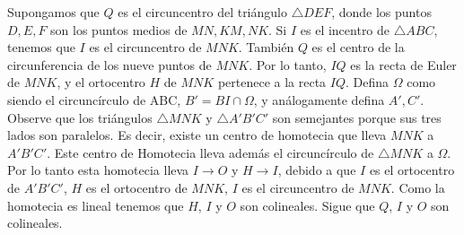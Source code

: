 \begin{sol}
	Supongamos que $Q$ es el circuncentro del tri\'angulo $\triangle DEF$, donde los puntos $D, E, F$ son los puntos medios de $MN, KM, NK$. Si $I$ es el incentro de $\triangle ABC$, tenemos que $I$ es el circuncentro de $MNK$. Tambi\'en $Q$ es el centro de la circunferencia de los nueve puntos de $MNK$. Por lo tanto, $IQ$ es la recta de Euler de $MNK$, y el ortocentro $H$ de $MNK$ pertenece a la recta $IQ$. Defina $\Omega$ como siendo el circunc\'irculo de ABC, $B' = BI \cap \Omega$, y an\'alogamente defina $A', C'$. Observe que los tri\'angulos $\triangle MNK$ y $\triangle A'B'C'$ son semejantes porque sus tres lados son paralelos. Es decir, existe un centro de homotecia que lleva $MNK$ a $A'B'C'$. Este centro de Homotecia lleva adem\'as el circunc\'irculo de $\triangle MNK$ a $\Omega$. Por lo tanto esta homotecia lleva $I \to O$ y $H \to I$, debido a que $I$ es el ortocentro de $A'B'C'$, $H$ es el ortocentro de $MNK$, $I$ es el circuncentro de  $MNK$. Como la homotecia es lineal tenemos que $H$, $I$ y $O$ son colineales. Sigue que $Q$, $I$ y $O$ son colineales.
\end{sol}